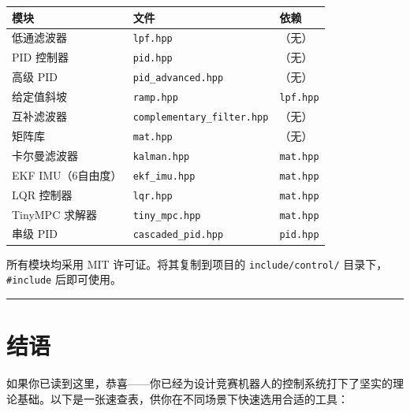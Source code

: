 \begin{center}
\begin{tabular}{lll}
\toprule
\textbf{模块} & \textbf{文件} & \textbf{依赖} \\
\midrule
低通滤波器 & \texttt{lpf.hpp} & （无） \\
PID 控制器 & \texttt{pid.hpp} & （无） \\
高级 PID & \texttt{pid\_advanced.hpp} & （无） \\
给定值斜坡 & \texttt{ramp.hpp} & \texttt{lpf.hpp} \\
互补滤波器 & \texttt{complementary\_filter.hpp} & （无） \\
矩阵库 & \texttt{mat.hpp} & （无） \\
卡尔曼滤波器 & \texttt{kalman.hpp} & \texttt{mat.hpp} \\
EKF IMU（6自由度） & \texttt{ekf\_imu.hpp} & \texttt{mat.hpp} \\
LQR 控制器 & \texttt{lqr.hpp} & \texttt{mat.hpp} \\
TinyMPC 求解器 & \texttt{tiny\_mpc.hpp} & \texttt{mat.hpp} \\
串级 PID & \texttt{cascaded\_pid.hpp} & \texttt{pid.hpp} \\
\bottomrule
\end{tabular}
\end{center}

所有模块均采用 MIT 许可证。将其复制到项目的 \texttt{include/control/} 目录下，\texttt{\#include} 后即可使用。

\newpage

\vspace{1em}
\hrule
\vspace{1em}

\section*{结语}

如果你已读到这里，恭喜——你已经为设计竞赛机器人的控制系统打下了坚实的理论基础。以下是一张速查表，供你在不同场景下快速选用合适的工具：

